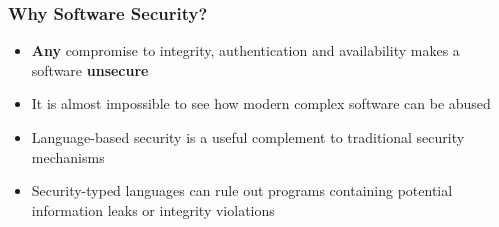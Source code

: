 \begin{frame}
\frametitle{Why Software Security?}
\begin{itemize}
	\item \textbf{Any} compromise to integrity, authentication and availability makes a software \textbf{unsecure}
	\item{It is almost impossible to see how modern complex software can be abused}
	\item<2-> Language-based security is a useful complement to traditional security mechanisms
	\item<2-> Security-typed languages can rule out programs containing potential information leaks or integrity violations
\end{itemize}
\end{frame}